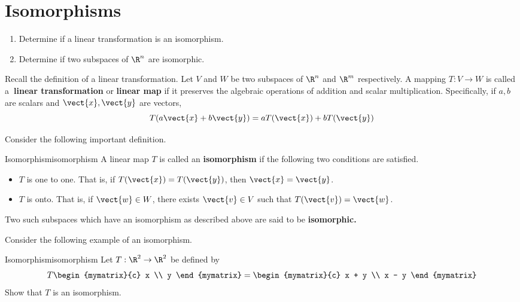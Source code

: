 \section{Isomorphisms}

\begin{outcome}
  \begin{enumerate}
  \item Determine if a linear transformation is an isomorphism.
  \item Determine if two subspaces of $\R^n$ are isomorphic. 
  \end{enumerate}
\end{outcome}

Recall the definition of a linear transformation. Let $V$ and $W$ be two subspaces of $\R^{n}$ and $\R^{m}$
respectively. A mapping $T:V\rightarrow W$ is called a\textbf{\ linear
transformation} or \textbf{linear map} if it preserves the algebraic
operations of addition and
 scalar multiplication. Specifically, if $a,b$
are scalars and $
\vect{x},\vect{y}$ are vectors, 
\begin{equation*}
T(a\vect{x}+b\vect{y}) =aT(\vect{x})+bT(\vect{y})
\end{equation*}

Consider the following important definition.

\begin{definition}{Isomorphism}{isomorphism}
A linear map $T$ is called an \textbf{isomorphism} 
if the following two conditions are satisfied.

\begin{itemize}
\item $T$ is one to one. That is, if $T(\vect{x})=T(\vect{y})$, then $\vect{x}=\vect{y}$.

\item $T$ is onto. That is, if $\vect{w}\in W$, there exists $
\vect{v}\in V$ such that $T(\vect{v})=\vect{w}$.
\end{itemize}

Two such subspaces which have an isomorphism as described above are said to
be \textbf{isomorphic.}
\end{definition}

Consider the following example of an isomorphism.

\begin{example}{Isomorphism}{isomorphism}
Let $T: \R^2 \to \R^2$ be defined by 
\[
T \begin{mymatrix}{c}
x \\
y
\end{mymatrix} = \begin{mymatrix}{c}
x + y \\
x - y 
\end{mymatrix}
\]
Show that $T$ is an isomorphism.
\end{example}

